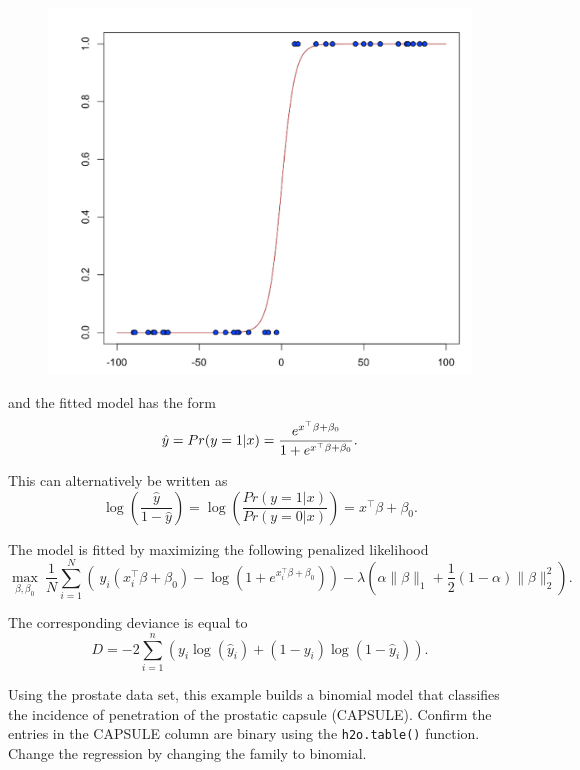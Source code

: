 \begin{figure}[h]
\centering
\includegraphics[scale=0.5]{images/scurve.png}
\end{figure}

and the fitted model has the form
$$ \hat{y} = Pr(y = 1|x) = {e^{x^{\top}\beta + \beta_0} \over 1 + e^{x^{\top} \beta + \beta_0} }.$$

This can alternatively be written as 
$$  \log \left( \frac{\hat{y}}{ 1- \hat{y} } \right)  = \log \left(  \frac{Pr(y=1|x)}{Pr(y=0|x)}   \right) = x^{\top} \beta + \beta_0.$$

The model is fitted by maximizing the following penalized likelihood 
$$  \max_{\beta,\beta_0} \   \frac{1}{N} \sum_{i=1}^{N} \left( \ y_i (x_i^{\top}\beta  + \beta_0) - \log (1 + e^{x_i^{\top}\beta  + \beta_0} ) \right)  - \lambda \left( \alpha \|\beta \|_1 +  \frac{1}{2}(1- \alpha)  \| \beta \|_2^2 \right). $$

The corresponding deviance is equal to 
$$D = -2\sum_{i=1}^{n} \left(y_i \log(\hat{y}_i) + (1 - y_i)\log(1-\hat{y}_i)  \right).$$

\waterExampleInR

Using the prostate data set, this example builds a binomial model that classifies the incidence of penetration of the prostatic
capsule (CAPSULE). Confirm the entries in the CAPSULE column are binary using the \texttt{h2o.table()}
function. Change the regression by changing the family to binomial.

